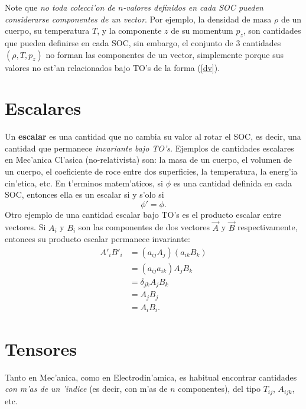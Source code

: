 Note que \textit{no toda colecci'on de $n$-valores definidos en cada SOC pueden considerarse componentes de un vector}. Por ejemplo, la densidad de masa $\rho$ de un cuerpo, su temperatura $T$, y la componente $z$ de su momentum $p_z$, son cantidades que pueden definirse en cada SOC, sin embargo, el conjunto de 3 cantidades $(\rho,T,p_z)$ no forman las componentes de un vector, simplemente porque sus valores no est'an relacionados bajo TO's de la forma (\ref{dv}).



\section{Escalares}

Un \textbf{escalar} es una cantidad que no cambia su valor al rotar el SOC, es decir, una cantidad que permanece \textit{invariante bajo TO's}. Ejemplos de cantidades escalares en Mec'anica Cl'asica (no-relativista) son: la masa de un cuerpo, el volumen de un cuerpo, el coeficiente de roce entre dos superficies, la temperatura, la energ'ia cin'etica, etc. En t'erminos matem'aticos, si $\phi$ es una cantidad definida en cada SOC, entonces ella es un escalar si y s'olo si
\begin{equation}
\phi'=\phi.
\end{equation}
Otro ejemplo de una cantidad escalar bajo TO's es el producto escalar entre vectores. Si $A_i$ y $B_i$ son las componentes de dos vectores $\vec{A}$ y $\vec{B}$ respectivamente, entonces su producto escalar permanece invariante:
\begin{align}
A'_iB'_i &= (a_{ij}A_j)(a_{ik}B_k) \\
&= (a_{ij}a_{ik})A_jB_k \\
&= \delta_{jk}A_jB_k \\ 
&= A_jB_j \\
&= A_iB_i.
\end{align}


\section{Tensores}
Tanto en Mec'anica, como en Electrodin'amica, es habitual encontrar cantidades \textit{con m'as de un 'indice} (es decir, con m'as de $n$ componentes), del tipo $T_{ij}$, $A_{ijk}$, etc. 

